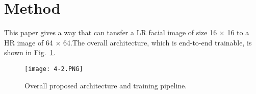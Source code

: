 \documentclass[10pt,twocolumn,letterpaper]{article}
\begin{document}
\section{Method}
	This paper gives a way that can tansfer a LR facial image of size 16 × 16 to 
 a HR image of 64 × 64.The overall architecture, which is end-to-end trainable, is shown in Fig.~\ref{fig:resolution1}.
 
 \begin{figure}[htb]
\centering
\texttt{[image: 4-2.PNG]}
\caption{Overall proposed architecture and training pipeline.}
\label{fig:resolution1}
\end{figure}




{\small


}
\end{document}
